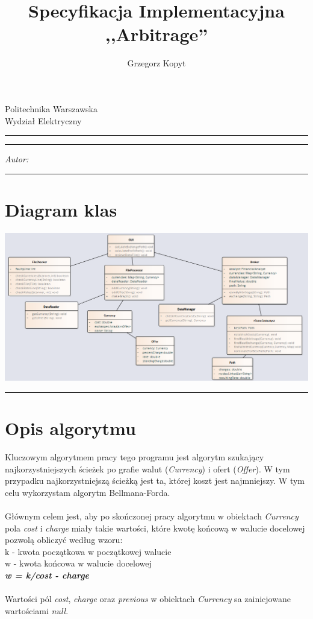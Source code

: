\documentclass[a4paper,11pt]{article}
\author{Grzegorz Kopyt}
\title{Specyfikacja Implementacyjna \\
,,Arbitrage''}
\makeatletter
\newcommand{\linia}{\rule{\linewidth}{0.4mm}}
\renewcommand{\maketitle}{\begin{titlepage}
    \vspace*{2cm}
    \begin{center}\LARGE
    Politechnika Warszawska\\
    Wydział Elektryczny\\
    \end{center}
    \vspace{5cm}
    \noindent\linia
    \begin{center}
      \LARGE \textsc{\@title}
         \end{center}
     \linia
    \vspace{0.5cm}
    \begin{flushright}
    \begin{minipage}{5cm}
    \textit{Autor:}\\
    \normalsize \textsc{\@author} \par
    \end{minipage}
    \vspace{5cm}
     \end{flushright}
    \vspace*{\stretch{6}}
    \begin{center}
    \@date
    \end{center}
  \end{titlepage}
}
\makeatother
\begin{document}
\maketitle

\tableofcontents
\vspace{1cm}
\noindent\linia
\section{Diagram klas}

\includegraphics[width = 18cm]{DiagramKlas}

\noindent\linia
\section{Opis algorytmu}
Kluczowym algorytmem pracy tego programu jest algorytm szukający najkorzystniejszych ścieżek po grafie walut (\textit{Currency}) i ofert (\textit{Offer}). W tym przypadku najkorzystniejszą ścieżką jest ta, której koszt jest najmniejszy. W tym celu wykorzystam algorytm Bellmana-Forda.
\\\\
Głównym celem jest, aby po skończonej pracy algorytmu w obiektach \textit{Currency} pola \textit{cost} i \textit{charge} miały takie wartości, które kwotę końcową w walucie docelowej pozwolą obliczyć według wzoru:
\\k - kwota początkowa w początkowej walucie
\\w - kwota końcowa w walucie docelowej
\\
\textbf{\emph{w = k/cost - charge}}
\\
\\Wartości pól \textit{cost}, \textit{charge} oraz \textit{previous} w obiektach \textit{Currency} sa zainicjowane wartościami \textit{null}.
\\
\end{document}
